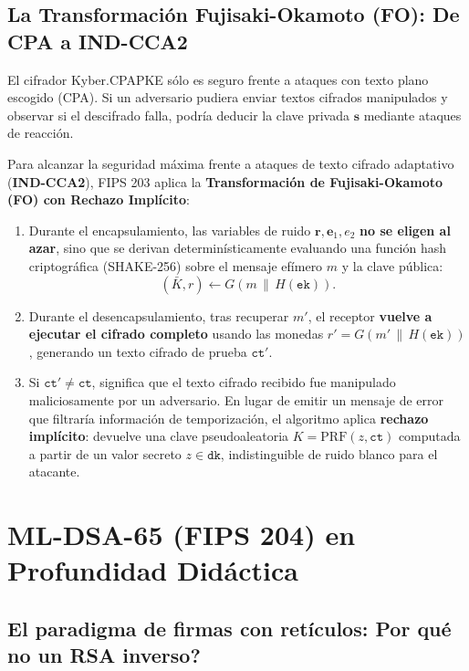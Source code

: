 \documentclass[11pt,a4paper,twoside,openright]{book}
\theoremstyle{plain}
\theoremstyle{definition}
\theoremstyle{remark}
\newcommand{\vv}[1]{\mathbf{#1}}
\begin{document}
\section{La Transformaci\'on Fujisaki-Okamoto (FO): De CPA a IND-CCA2}

El cifrador Kyber.CPAPKE s\'olo es seguro frente a ataques con texto plano escogido (CPA). Si un adversario pudiera enviar textos cifrados manipulados y observar si el descifrado falla, podr\'ia deducir la clave privada $\vv{s}$ mediante ataques de reacci\'on.

Para alcanzar la seguridad m\'axima frente a ataques de texto cifrado adaptativo (\textbf{IND-CCA2}), FIPS 203 aplica la \textbf{Transformaci\'on de Fujisaki-Okamoto (FO) con Rechazo Impl\'icito}:

\begin{enumerate}
  \item Durante el encapsulamiento, las variables de ruido $\vv{r}, \vv{e}_1, e_2$ \textbf{no se eligen al azar}, sino que se derivan determin\'isticamente evaluando una funci\'on hash criptogr\'afica (SHAKE-256) sobre el mensaje ef\'imero $m$ y la clave p\'ublica:
  \[
    (\bar{K}, r) \leftarrow G(m \,\|\, H(\mathtt{ek})).
  \]
  \item Durante el desencapsulamiento, tras recuperar $m'$, el receptor \textbf{vuelve a ejecutar el cifrado completo} usando las monedas $r' = G(m' \,\|\, H(\mathtt{ek}))$, generando un texto cifrado de prueba $\mathtt{ct}'$.
  \item Si $\mathtt{ct}' \neq \mathtt{ct}$, significa que el texto cifrado recibido fue manipulado maliciosamente por un adversario. En lugar de emitir un mensaje de error que filtrar\'ia informaci\'on de temporizaci\'on, el algoritmo aplica \textbf{rechazo impl\'icito}: devuelve una clave pseudoaleatoria $K = \mathrm{PRF}(z, \mathtt{ct})$ computada a partir de un valor secreto $z \in \mathtt{dk}$, indistinguible de ruido blanco para el atacante.
\end{enumerate}

\chapter{ML-DSA-65 (FIPS 204) en Profundidad Did\'actica}
\label{chap:mldsa_detalle}

\section{El paradigma de firmas con ret\'iculos: \textquestiondown Por qu\'e no un RSA inverso?}
\end{document}
